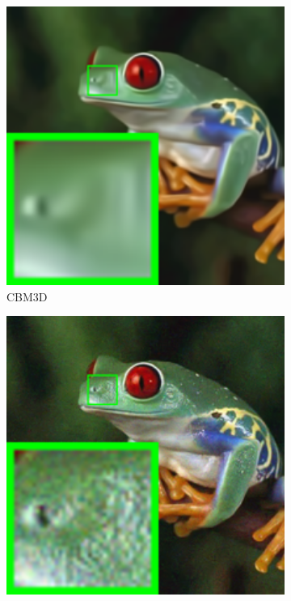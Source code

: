 \begin{figure}
\begin{subfigure}[t]{0.19\textwidth}
        \includegraphics[width=1\textwidth]{images/mcwnnm/nc/resize_br_CBM3D_frog.png}
		\caption{CBM3D}
    \end{subfigure}
    \hfill
    \begin{subfigure}[t]{0.19\textwidth}
        \centering
        \includegraphics[width=1\textwidth]{images/mcwnnm/nc/resize_br_MLP_frog.png}

\end{subfigure}
\end{figure}
